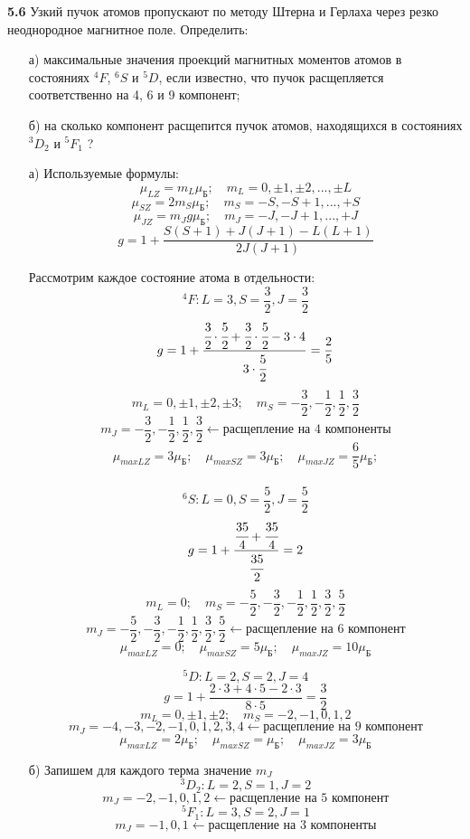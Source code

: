 	\textbf{5.6 }
		Узкий пучок атомов пропускают по методу Штерна и Герлаха через резко
		неоднородное магнитное поле. Определить: 
		\vspace*{-1em}
		\begin{itemize}\itemsep-8pt
			\item[а)] максимальные значения проекций магнитных моментов 
			атомов в состояниях \(^4F \), \( ^6S \) и \( ^5D \), если
			известно, что пучок расщепляется соответственно на 4, 6 и 9 компонент;
			\item[б)] на сколько компонент расщепится пучок атомов, 
			находящихся в состояниях \( ^3D_2 \) и \( ^5F_1 \) ?
		\end{itemize}
		\vspace*{-1em}
		\begin{itemize}\itemsep-8pt
			\item[а)] Используемые формулы:
			\[ 
				\mu_{LZ} = m_L\mu_\text{Б};\quad
				m_L = 0, \pm1, \pm2, ..., \pm L 
			\]
			\[ 
				\mu_{SZ} = 2m_S\mu_\text{Б};\quad
				m_S = -S, -S+1, ..., +S  
			\]
			\[ 
				\mu_{JZ} = m_J g\mu_\text{Б};\quad
				m_J = -J, -J+1, ..., +J  
			\]
			\[ g = 1 + \frac{S(S+1)+J(J+1)-L(L+1)}{2J(J+1)} \]

			Рассмотрим каждое состояние атома в отдельности:
			\[ ^4F: L=3, S=\frac{3}{2}, J= \frac{3}{2} \]
			\[ 
				g = 1 + \frac{\cfrac{3}{2}\cdot\cfrac{5}{2} 
				+ \cfrac{3}{2}\cdot\cfrac{5}{2} - 3\cdot4}{3\cdot\cfrac{5}{2}} 
				= \frac{2}{5}  
			\]
			\[ 
				m_L = 0, \pm1, \pm2, \pm3;\quad
				m_S = -\frac{3}{2}, -\frac{1}{2}, \frac{1}{2}, \frac{3}{2}
			\]
			\[
				m_J = -\frac{3}{2}, -\frac{1}{2}, \frac{1}{2}, \frac{3}{2} \leftarrow 
				\text{расщепление на 4 компоненты}
			\]
			\[ 
				\mu_{maxLZ} = 3\mu_\text{Б};\quad
				\mu_{maxSZ} = 3\mu_\text{Б};\quad
				\mu_{maxJZ} = \frac{6}{5}\mu_\text{Б};
			\] \\

			\[ ^6S: L=0, S=\frac{5}{2}, J= \frac{5}{2} \]
			\[ g = 1 + \frac{\cfrac{35}{4}+\cfrac{35}{4}}{\cfrac{35}{2}} = 2\]
			\[ 
				m_L = 0;\quad
				m_S = -\frac{5}{2}, -\frac{3}{2}, -\frac{1}{2}, 
				\frac{1}{2}, \frac{3}{2}, \frac{5}{2}
			\]
			\[
				m_J = -\frac{5}{2}, -\frac{3}{2}, -\frac{1}{2}, \frac{1}{2}, 
				\frac{3}{2}, \frac{5}{2} \leftarrow \text{расщепление на 6 компонент}
			\]
			\[ 
				\mu_{maxLZ} = 0;\quad
				\mu_{maxSZ} = 5\mu_\text{Б};\quad
				\mu_{maxJZ} = 10\mu_\text{Б}
			\]

			\[ ^5D: L=2, S=2, J=4\]
			\[ g = 1 + \frac{2\cdot3 + 4\cdot5 - 2\cdot3}{8\cdot5} = \frac{3}{2}\]
			\[ 
				m_L = 0, \pm1, \pm2;\quad
				m_S = -2, -1, 0, 1, 2
			\]
			\[
				m_J = -4, -3, -2, -1, 0, 1, 2, 3, 4 \leftarrow 
				\text{расщепление на 9 компонент}
			\]
			\[ 
				\mu_{maxLZ} = 2\mu_\text{Б};\quad
				\mu_{maxSZ} = \mu_\text{Б};\quad
				\mu_{maxJZ} = 3\mu_\text{Б}
			\]
			\item[б)] Запишем для каждого терма значение \( m_J \)
			\[ ^3D_2: L=2, S=1, J=2 \]
			\[ m_J = -2, -1, 0, 1, 2 \leftarrow \text{расщепление на 5 компонент} \]
			\[ ^5F_1: L=3, S=2, J=1 \]
			\[ m_J = -1, 0, 1 \leftarrow \text{расщепление на 3 компоненты} \]
		\end{itemize}

